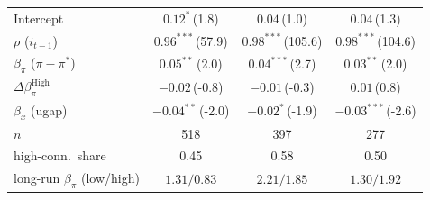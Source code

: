 \begin{tabular}{lccc}
Intercept & $0.12^{*}$\,{\scriptsize(1.8)} & $0.04$\,{\scriptsize(1.0)} & $0.04$\,{\scriptsize(1.3)} \\
$\rho$ ($i_{t-1}$) & $0.96^{***}$\,{\scriptsize(57.9)} & $0.98^{***}$\,{\scriptsize(105.6)} & $0.98^{***}$\,{\scriptsize(104.6)} \\
$\beta_\pi$ ($\pi-\pi^*$) & $0.05^{**}$\,{\scriptsize(2.0)} & $0.04^{***}$\,{\scriptsize(2.7)} & $0.03^{**}$\,{\scriptsize(2.0)} \\
$\Delta\beta_\pi^{\text{High}}$ & $-0.02$\,{\scriptsize(-0.8)} & $-0.01$\,{\scriptsize(-0.3)} & $0.01$\,{\scriptsize(0.8)} \\
$\beta_x$ (ugap) & $-0.04^{**}$\,{\scriptsize(-2.0)} & $-0.02^{*}$\,{\scriptsize(-1.9)} & $-0.03^{***}$\,{\scriptsize(-2.6)} \\
\addlinespace
$n$ & 518 & 397 & 277 \\
high-conn.\ share & 0.45 & 0.58 & 0.50 \\
long-run $\beta_\pi$ (low/high) & $1.31/0.83$ & $2.21/1.85$ & $1.30/1.92$ \\
\bottomrule
\end{tabular}
